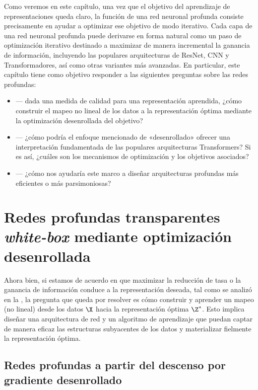 \documentclass[../../book-main.tex]{subfiles}
\begin{document}
Como veremos en este capítulo, una vez que el objetivo del aprendizaje de representaciones
queda claro, la función de una red neuronal profunda consiste precisamente en
ayudar a optimizar ese objetivo de modo iterativo. Cada capa de una red neuronal profunda
puede derivarse en forma natural como un paso de optimización iterativo destinado a
maximizar de manera incremental la ganancia de información, incluyendo las populares
arquitecturas de ResNet, CNN y Transformadores, así como otras variantes más
avanzadas. En particular, este capítulo tiene como objetivo responder a las
siguientes preguntas sobre las redes profundas:
\begin{itemize}
    \item {} --- dada una
        medida de calidad para una representación aprendida, ¿cómo
        construir el mapeo no lineal de los datos a la representación óptima
        mediante la optimización desenrollada del objetivo?
    \item {} --- ¿cómo podría el
        enfoque mencionado de «desenrollado» ofrecer una interpretación fundamentada
        de las populares arquitecturas Transformers? Si es así, ¿cuáles son los
        mecanismos de optimización y los objetivos asociados?
    \item {} ---
        ¿cómo nos ayudaría este marco a diseñar arquitecturas profundas más eficientes o
        más parsimoniosas?
\end{itemize}

\section{Redes profundas transparentes \textit{white-box} mediante optimización
desenrollada}\label{sec:chap4-white-box-model-via-unrolling}

Ahora bien, si estamos de acuerdo en que maximizar la reducción de tasa o la ganancia de información
conduce a la representación deseada, tal como se analizó en la
, la pregunta que queda por resolver
es cómo construir y aprender un mapeo (no lineal) desde los
datos $\X$ hacia la representación óptima $\Z^*$. Esto implica
diseñar una arquitectura de red y un algoritmo de aprendizaje que puedan
captar de manera eficaz las estructuras subyacentes de los datos y
materializar fielmente la representación óptima.

\subsection{Redes profundas a partir del descenso por gradiente desenrollado}
\end{document}
